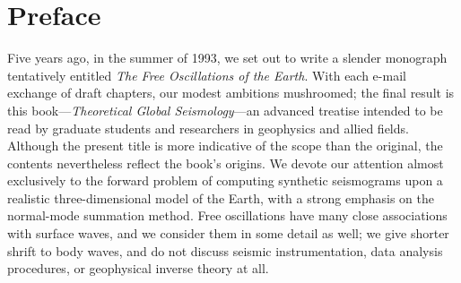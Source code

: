 \setcounter{chapter}{0}
\chapter*{Preface}

\thispagestyle{plain}
Five years ago, in the summer of 1993, we set out to
write a slender monograph tentatively entitled
{\em The Free Oscillations of the Earth\/}.
With each e-mail exchange of draft chapters,
our modest ambitions mushroomed; the final result is this
book---{\em Theoretical Global Seismology\/}---an
advanced treatise intended to be read by graduate
students and researchers in geophysics and allied fields.
Although the present title is more indicative of the scope
than the original, the contents nevertheless reflect the book's origins.
We devote our attention almost exclusively to the forward
problem of computing synthetic seismograms upon a realistic
three-dimensional model of the Earth, with a strong emphasis
on the normal-mode summation method.  Free oscillations have
many close associations with surface waves,
and we consider them in some detail as well; we give
shorter shrift to body waves, and do not discuss seismic
instrumentation, data analysis procedures, or geophysical
inverse theory at all.

